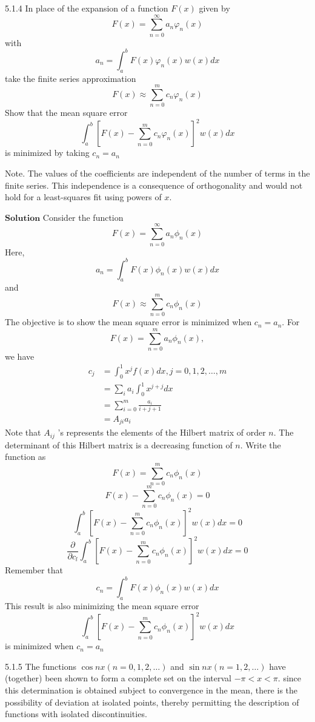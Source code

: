 \documentclass{article}
\begin{document}
\begin{flushleft}
\newpage

\begin{mybox}{5.1.4}
In place of the expansion of a function $F(x)$ given by
$$
F(x)=\sum_{n=0}^{\infty} a_{n} \varphi_{n}(x)
$$
with
$$
a_{n}=\int_{a}^{b} F(x) \varphi_{n}(x) w(x) d x
$$
take the finite series approximation
$$
F(x) \approx \sum_{n=0}^{m} c_{n} \varphi_{n}(x)
$$
Show that the mean square error
$$
\int_{a}^{b}\left[F(x)-\sum_{n=0}^{m} c_{n} \varphi_{n}(x)\right]^{2} w(x) d x
$$
is minimized by taking $c_{n}=a_{n}$

Note. The values of the coefficients are independent of the number of terms in the finite series. This independence is a consequence of orthogonality and would not hold for a least-squares fit using powers of $x$.
\end{mybox}




$\boxed{\textbf{Solution}}$ Consider the function 
$$
F(x)=\sum_{n=0}^{\infty} a_{n} \phi_{n}(x)
$$
Here, $$a_{n}=\int_{a}^{b} F(x) \phi_{n}(x) w(x) d x$$ and $$F(x) \approx \sum_{n=0}^{m} c_{n} \phi_{n}(x)$$
The objective is to show the mean square error is minimized when $c_{n}=a_{n}$.
For $$F(x)=\sum_{n=0}^{m} a_{n} \phi_{n}(x),$$ we have
$$\begin{aligned} c_{j} &=\int_{0}^{1} x^{j} f(x) d x, j=0,1,2, \ldots, m \\ &=\sum_{i} a_{i} \int_{0}^{1} x^{j+j} d x \\ &=\sum_{i=0}^{m} \frac{a_{i}}{i+j+1} \\ &=A_{j i} a_{i} \end{aligned}$$
Note that $A_{i j}$ 's represents the elements of the Hilbert matrix of order $n$.
The determinant of this Hilbert matrix is a decreasing function of $n$.
Write the function as
$$
F(x)=\sum_{n=0}^{m} c_{n} \phi_{n}(x)
$$
$$
F(x)-\sum_{n=0}^{m} c_{n} \phi_{n}(x)=0
$$
$$
\int_{a}^{b}\left[F(x)-\sum_{n=0}^{m} c_{n} \phi_{n}(x)\right]^{2} w(x) d x=0
$$
$$
\frac{\partial}{\partial c_{l}} \int_{a}^{b}\left[F(x)-\sum_{n=0}^{m} c_{n} \phi_{n}(x)\right]^{2} w(x) d x=0
$$
Remember that
$$
c_{n}=\int_{a}^{b} F(x) \phi_{n}(x) w(x) d x
$$
This result is also minimizing the mean square error $$\int_{a}^{b}\left[F(x)-\sum_{n=0}^{m} c_{n} \phi_{n}(x)\right]^{2} w(x) d x$$ is
minimized when $c_{n}=a_{n}$

\newpage

\begin{mybox}{5.1.5}
The functions $\cos n x(n=0,1,2, \ldots)$ and $\sin n x(n=1,2, \ldots)$ have (together) been shown to form a complete set on the interval $-\pi<x<\pi .$ since this determination is obtained subject to convergence in the mean, there is the possibility of deviation at isolated points, thereby permitting the description of functions with isolated discontinuities.


\end{mybox}
\end{flushleft}
\end{document}
